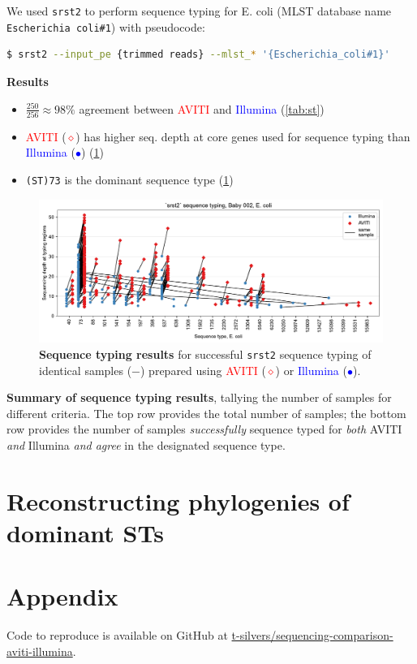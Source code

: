 \documentclass{article}
\begin{document}
We used \texttt{srst2} to perform sequence typing for E. coli (MLST database name \texttt{Escherichia coli\#1}) with pseudocode:

\begin{lstlisting}[language=bash]
$ srst2 --input_pe {trimmed reads} --mlst_* '{Escherichia_coli#1}'
\end{lstlisting}

\textbf{Results}

\begin{itemize}
    \item $\frac{250}{256} \approx 98\%$ agreement between \textcolor{red}{AVITI} and \textcolor{blue}{Illumina} (\cref{tab:st})
    \item \textcolor{red}{AVITI} (\textcolor{red}{$\diamond$}) has higher seq. depth at core genes used for sequence typing than \textcolor{blue}{Illumina} (\textcolor{blue}{$\bullet$}) (\cref{figure:st})
    \item \texttt{(ST)73} is the dominant sequence type (\cref{figure:st})
\end{itemize}

\begin{figure}[H]
    \centering
    \includegraphics[width=.95\textwidth]{figures/sequence_typing.pdf}
    \caption{
        \textbf{Sequence typing results} for successful \texttt{srst2} sequence typing of identical samples ($-$) 
        prepared using \textcolor{red}{AVITI} (\textcolor{red}{$\diamond$}) or \textcolor{blue}{Illumina} (\textcolor{blue}{$\bullet$}).
    }
    \label{figure:st}
\end{figure}

\begin{table}[H]
    \centering
    
    \caption{
        \textbf{Summary of sequence typing results}, tallying the number of samples for different criteria. 
        The top row provides the total number of samples; 
        the bottom row provides the number of samples \textit{successfully} sequence typed for \textit{both} AVITI \textit{and} Illumina 
        \textit{and agree} in the designated sequence type.
    }
    \label{tab:st}
\end{table}


\section{Reconstructing phylogenies of dominant STs}

\section{Appendix}

Code to reproduce is available on GitHub at \href{https://github.com/t-silvers/sequencing-comparison-aviti-illumina}{t-silvers/sequencing-comparison-aviti-illumina}.
\end{document}
